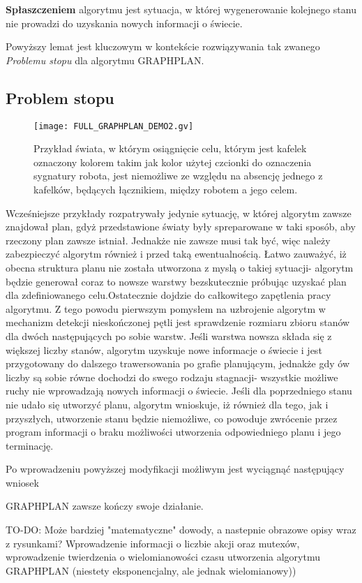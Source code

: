     \begin{definition}
        \textbf{Spłaszczeniem} algorytmu jest sytuacja, w której wygenerowanie kolejnego stanu nie prowadzi 
        do uzyskania nowych informacji o świecie.
    \end{definition}

    Powyższy lemat jest kluczowym w kontekście rozwiązywania tak zwanego \textit{Problemu stopu} dla algorytmu GRAPHPLAN.

    \subsection{Problem stopu}
    \begin{figure}[H]
        \texttt{[image: FULL\_GRAPHPLAN\_DEMO2.gv]}
        \centering
        \caption{Przykład świata, w którym osiągnięcie celu, którym jest kafelek oznaczony kolorem takim jak kolor użytej czcionki do oznaczenia 
        sygnatury robota, jest niemożliwe ze względu na absencję jednego z kafelków, będących łącznikiem, między robotem a jego celem.}
        \label{PrzykladPlanW1}
    \end{figure}
    Wcześniejsze przykłady rozpatrywały jedynie sytuację, w której algorytm zawsze znajdował plan, gdyż przedstawione światy były spreparowane w taki sposób, 
    aby rzeczony plan zawsze istniał. Jednakże nie zawsze musi tak być, więc należy zabezpieczyć algorytm również i przed taką ewentualnością. Łatwo zauważyć, 
    iż obecna struktura planu nie została utworzona z myslą o takiej sytuacji- algorytm będzie generował coraz to nowsze warstwy bezskutecznie próbując uzyskać 
    plan dla zdefiniowanego celu.Ostatecznie dojdzie do całkowitego zapętlenia pracy algorytmu. 
    Z tego powodu pierwszym pomysłem na uzbrojenie algorytm w mechanizm detekcji nieskończonej pętli jest sprawdzenie rozmiaru zbioru stanów dla dwóch 
    następujących po sobie warstw. Jeśli warstwa nowsza składa się z większej liczby stanów, algorytm uzyskuje nowe informacje o świecie i jest 
    przygotowany do dalszego trawersowania po grafie planującym, jednakże gdy ów liczby są sobie równe dochodzi do swego rodzaju stagnacji- wszystkie 
    możliwe ruchy nie wprowadzają nowych informacji o świecie. Jeśli dla poprzedniego stanu nie udało się utworzyć planu, algorytm wnioskuje, iż 
    również dla tego, jak i przyszłych, utworzenie stanu będzie niemożliwe, co powoduje zwrócenie przez program informacji o braku 
    możliwości utworzenia odpowiedniego planu i jego terminację.

    Po wprowadzeniu powyższej modyfikacji możliwym jest wyciągnąć następujący wniosek 

    \begin{lemma}
        GRAPHPLAN zawsze kończy swoje działanie.
    \end{lemma} 

    TO-DO: Może bardziej "matematyczne" dowody, a nastepnie obrazowe opisy wraz z rysunkami?
    Wprowadzenie informacji o liczbie akcji oraz mutexów, wprowadzenie twierdzenia o 
    wielomianowości czasu utworzenia algorytmu GRAPHPLAN (niestety eksponencjalny, ale 
    jednak wielomianowy))


    


